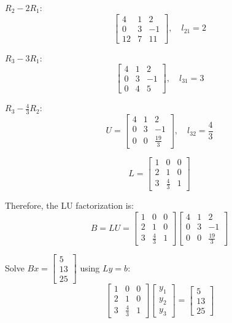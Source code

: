 \documentclass[12pt]{article}
\begin{document}
$R_2 - 2R_1$:
\[
	\begin{bmatrix}
		4 & 1 & 2 \\
		0 & 3 & -1 \\
		12 & 7 & 11
	\end{bmatrix}, \quad l_{21} = 2
\]

$R_3 - 3R_1$:
\[
	\begin{bmatrix}
		4 & 1 & 2 \\
		0 & 3 & -1 \\
		0 & 4 & 5
	\end{bmatrix}, \quad l_{31} = 3
\]

$R_3 - \frac{4}{3}R_2$:
\[
	U = \begin{bmatrix}
		4 & 1 & 2 \\
		0 & 3 & -1 \\
		0 & 0 & \frac{19}{3}
	\end{bmatrix}, \quad l_{32} = \frac{4}{3}
\]

\[
	L = \begin{bmatrix}
		1 & 0 & 0 \\
		2 & 1 & 0 \\
		3 & \frac{4}{3} & 1
	\end{bmatrix}
\]

Therefore, the LU factorization is:
\[
	B = LU = \begin{bmatrix}
		1 & 0 & 0 \\
		2 & 1 & 0 \\
		3 & \frac{4}{3} & 1
	\end{bmatrix} \begin{bmatrix}
		4 & 1 & 2 \\
		0 & 3 & -1 \\
		0 & 0 & \frac{19}{3}
	\end{bmatrix}
\]

Solve $Bx = \begin{bmatrix} 5 \\ 13 \\ 25 \end{bmatrix}$ using $Ly = b$:
\[
	\begin{bmatrix}
		1 & 0 & 0 \\
		2 & 1 & 0 \\
		3 & \frac{4}{3} & 1
	\end{bmatrix} \begin{bmatrix}
		y_1 \\ y_2 \\ y_3
	\end{bmatrix} = \begin{bmatrix}
		5 \\ 13 \\ 25
	\end{bmatrix}
\]
\end{document}
